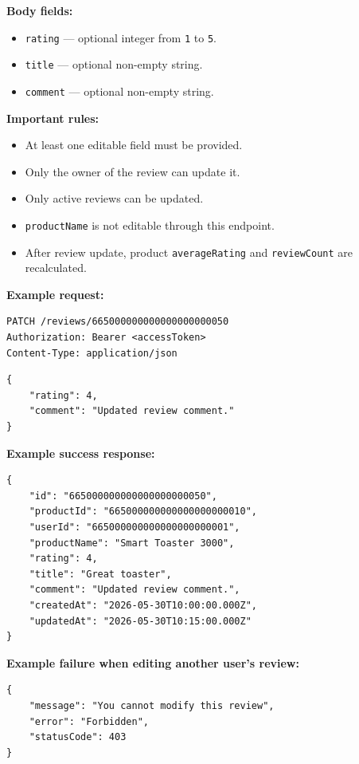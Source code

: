 \textbf{Body fields:}

\begin{itemize}
    \item \texttt{rating} --- optional integer from \texttt{1} to \texttt{5}.
    \item \texttt{title} --- optional non-empty string.
    \item \texttt{comment} --- optional non-empty string.
\end{itemize}

\textbf{Important rules:}

\begin{itemize}
    \item At least one editable field must be provided.
    \item Only the owner of the review can update it.
    \item Only active reviews can be updated.
    \item \texttt{productName} is not editable through this endpoint.
    \item After review update, product \texttt{averageRating} and \texttt{reviewCount} are recalculated.
\end{itemize}

\textbf{Example request:}

\begin{verbatim}
PATCH /reviews/665000000000000000000050
Authorization: Bearer <accessToken>
Content-Type: application/json
\end{verbatim}

\begin{verbatim}
{
    "rating": 4,
    "comment": "Updated review comment."
}
\end{verbatim}

\textbf{Example success response:}

\begin{verbatim}
{
    "id": "665000000000000000000050",
    "productId": "665000000000000000000010",
    "userId": "665000000000000000000001",
    "productName": "Smart Toaster 3000",
    "rating": 4,
    "title": "Great toaster",
    "comment": "Updated review comment.",
    "createdAt": "2026-05-30T10:00:00.000Z",
    "updatedAt": "2026-05-30T10:15:00.000Z"
}
\end{verbatim}

\textbf{Example failure when editing another user's review:}

\begin{verbatim}
{
    "message": "You cannot modify this review",
    "error": "Forbidden",
    "statusCode": 403
}
\end{verbatim}

